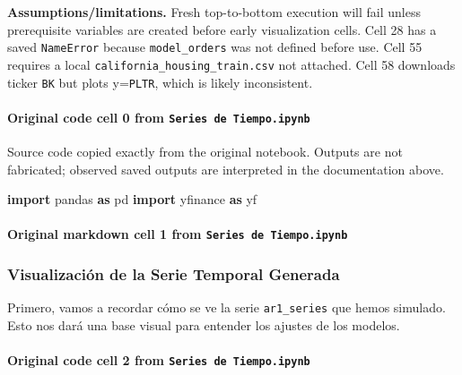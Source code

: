 \documentclass[
  11pt,
]{article}
\newenvironment{Shaded}{}{}
\newcommand{\ImportTok}[1]{\textcolor[rgb]{0.00,0.50,0.00}{\textbf{#1}}}
\newcommand{\NormalTok}[1]{#1}
\begin{document}
\textbf{Assumptions/limitations.} Fresh top-to-bottom execution will fail unless prerequisite variables are created before early visualization cells. Cell 28 has a saved \texttt{NameError} because \texttt{model\_orders} was not defined before use. Cell 55 requires a local \texttt{california\_housing\_train.csv} not attached. Cell 58 downloads ticker \texttt{BK} but plots y=\texttt{PLTR}, which is likely inconsistent.

\paragraph{\texorpdfstring{Original code cell 0 from \texttt{Series\ de\ Tiempo.ipynb}}{Original code cell 0 from Series de Tiempo.ipynb}}\label{original-code-cell-0-from-series-de-tiempoipynb}

Source code copied exactly from the original notebook. Outputs are not fabricated; observed saved outputs are interpreted in the documentation above.

\begin{Shaded}
\begin{Highlighting}[]
\ImportTok{import}\NormalTok{ pandas }\ImportTok{as}\NormalTok{ pd}
\ImportTok{import}\NormalTok{ yfinance }\ImportTok{as}\NormalTok{ yf}
\end{Highlighting}
\end{Shaded}

\paragraph{\texorpdfstring{Original markdown cell 1 from \texttt{Series\ de\ Tiempo.ipynb}}{Original markdown cell 1 from Series de Tiempo.ipynb}}\label{original-markdown-cell-1-from-series-de-tiempoipynb}

\subsubsection{Visualización de la Serie Temporal Generada}\label{visualizaciuxf3n-de-la-serie-temporal-generada}

Primero, vamos a recordar cómo se ve la serie \texttt{ar1\_series} que hemos simulado. Esto nos dará una base visual para entender los ajustes de los modelos.

\paragraph{\texorpdfstring{Original code cell 2 from \texttt{Series\ de\ Tiempo.ipynb}}{Original code cell 2 from Series de Tiempo.ipynb}}\label{original-code-cell-2-from-series-de-tiempoipynb}
\end{document}
